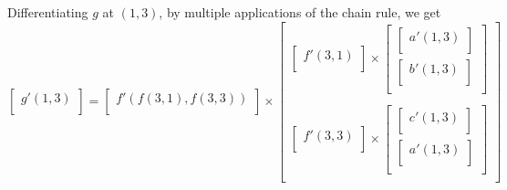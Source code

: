 \documentclass{article}
\theoremstyle{plain} %
\numberwithin{thm}{section} %
\theoremstyle{definition}
\begin{document}
\begin{question}{29}
        Differentiating \(g\) at \((1,3)\), by multiple applications of the chain rule, we get
        \[
            \begin{bmatrix}
                 g'(1,3) \\
            \end{bmatrix}
            = \begin{bmatrix}
                 f'(f(3,1),f(3,3)) \\
            \end{bmatrix}
            \times \begin{bmatrix}
                 \begin{bmatrix}
                     f'(3,1) \\
                 \end{bmatrix}
                 \times 
                 \begin{bmatrix}
                     \begin{bmatrix}
                         a'(1,3) \\
                     \end{bmatrix} \\
                     \begin{bmatrix}
                         b'(1,3) \\
                     \end{bmatrix}\\
                 \end{bmatrix} \\
                  \\
                \begin{bmatrix}
                    f'(3, 3) \\
                \end{bmatrix}
                \times 
                \begin{bmatrix}
                    \begin{bmatrix}
                        c'(1,3) \\
                    \end{bmatrix} \\
                    \begin{bmatrix}
                        a'(1,3) \\
                    \end{bmatrix} \\
                \end{bmatrix} \\
            \end{bmatrix}
\]
\end{question}
\end{document}

